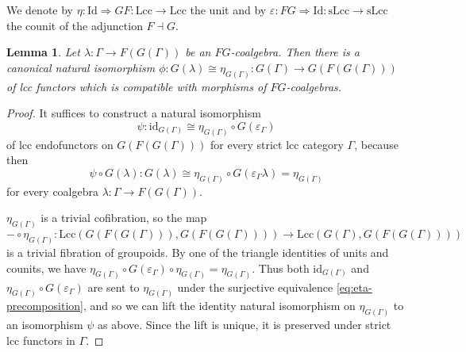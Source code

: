 \documentclass[a4paper]{article}
\newtheorem{lemma}[theorem]{Lemma}
\theoremstyle{remark}
\theoremstyle{definition}
\begin{document}
We denote by $\eta : \mathrm{Id} \Rightarrow G F : \mathrm{Lcc} \rightarrow \mathrm{Lcc}$ the unit and by $\varepsilon : F G \Rightarrow \mathrm{Id} : \mathrm{sLcc} \rightarrow \mathrm{sLcc}$ the counit of the adjunction $F \dashv G$.

\begin{lemma}
  \label{lem:coalgebra-vs-eta}
  Let $\lambda : \Gamma \rightarrow F(G(\Gamma))$ be an $FG$-coalgebra.
  Then there is a canonical natural isomorphism $\phi : G(\lambda) \cong \eta_{G(\Gamma)} : G(\Gamma) \rightarrow G(F(G(\Gamma)))$ of lcc functors which is compatible with morphisms of $FG$-coalgebras.
\end{lemma}
\begin{proof}
  It suffices to construct a natural isomorphism
  \begin{equation}
    \psi : \mathrm{id}_{G(\Gamma)} \cong \eta_{G(\Gamma)} \circ G(\varepsilon_\Gamma)
  \end{equation}
  of lcc endofunctors on $G(F(G(\Gamma)))$ for every strict lcc category $\Gamma$, because then
  \begin{equation}
    \psi \circ G(\lambda) : G(\lambda) \cong \eta_{G(\Gamma)} \circ G(\varepsilon_\Gamma \lambda) = \eta_{G(\Gamma)}
  \end{equation}
  for every coalgebra $\lambda : \Gamma \rightarrow F(G(\Gamma))$.

  $\eta_{G(\Gamma)}$ is a trivial cofibration, so the map
  \begin{equation}
    \label{eq:eta-precomposition}
    - \circ \eta_{G(\Gamma)} : \mathrm{Lcc}(G(F(G(\Gamma))), G(F(G(\Gamma)))) \rightarrow \mathrm{Lcc}(G(\Gamma), G(F(G(\Gamma)))) 
  \end{equation}
  is a trivial fibration of groupoids.
  By one of the triangle identities of units and counits, we have $\eta_{G(\Gamma)} \circ G(\varepsilon_\Gamma) \circ \eta_{G(\Gamma)} = \eta_{G(\Gamma)}$.
  Thus both $\mathrm{id}_{G(\Gamma)}$ and $\eta_{G(\Gamma)} \circ G(\varepsilon_\Gamma)$ are sent to $\eta_{G(\Gamma)}$ under the surjective equivalence \eqref{eq:eta-precomposition}, and so we can lift the identity natural isomorphism on $\eta_{G(\Gamma)}$ to an isomorphism $\psi$ as above.
  Since the lift is unique, it is preserved under strict lcc functors in $\Gamma$.
\end{proof}
\end{document}
